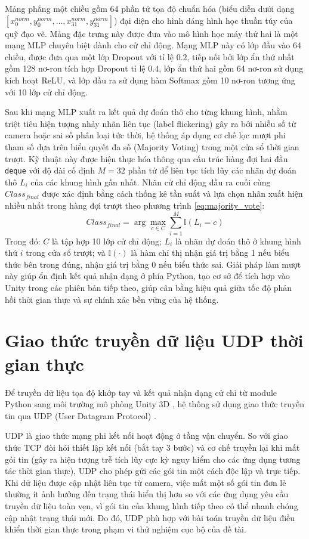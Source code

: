 \documentclass[../BTL.tex]{subfiles}
\begin{document}
Mảng phẳng một chiều gồm 64 phần tử tọa độ chuẩn hóa (biểu diễn dưới dạng $[x^{norm}_0, y^{norm}_0, \dots, x^{norm}_{31}, y^{norm}_{31}]$) đại diện cho hình dáng hình học thuần túy của quỹ đạo vẽ. Mảng đặc trưng này được đưa vào mô hình học máy thứ hai là một mạng MLP chuyên biệt dành cho cử chỉ động. Mạng MLP này có lớp đầu vào 64 chiều, được đưa qua một lớp Dropout với tỉ lệ $0.2$, tiếp nối bởi lớp ẩn thứ nhất gồm 128 nơ-ron tích hợp Dropout tỉ lệ $0.4$, lớp ẩn thứ hai gồm 64 nơ-ron sử dụng kích hoạt ReLU, và lớp đầu ra sử dụng hàm Softmax gồm 10 nơ-ron tương ứng với 10 lớp cử chỉ động.

Sau khi mạng MLP xuất ra kết quả dự đoán thô cho từng khung hình, nhằm triệt tiêu hiện tượng nhảy nhãn liên tục (label flickering) gây ra bởi nhiễu số từ camera hoặc sai số phân loại tức thời, hệ thống áp dụng cơ chế lọc mượt phi tham số dựa trên biểu quyết đa số (Majority Voting) trong một cửa sổ thời gian trượt. Kỹ thuật này được hiện thực hóa thông qua cấu trúc hàng đợi hai đầu \texttt{deque} với độ dài cố định $M = 32$ phần tử để liên tục tích lũy các nhãn dự đoán thô $L_i$ của các khung hình gần nhất. Nhãn cử chỉ động đầu ra cuối cùng $Class_{final}$ được xác định bằng cách thống kê tần suất và lựa chọn nhãn xuất hiện nhiều nhất trong hàng đợi trượt theo phương trình \eqref{eq:majority_vote}:
\begin{equation}
\label{eq:majority_vote}
Class_{final} = \arg \max_{c \in C} \sum_{i=1}^{M} \mathbb{I}(L_i = c)
\end{equation}
Trong đó: $C$ là tập hợp 10 lớp cử chỉ động; $L_i$ là nhãn dự đoán thô ở khung hình thứ $i$ trong cửa sổ trượt; và $\mathbb{I}(\cdot)$ là hàm chỉ thị nhận giá trị bằng 1 nếu biểu thức bên trong đúng, nhận giá trị bằng 0 nếu biểu thức sai. Giải pháp làm mượt này giúp ổn định kết quả nhận dạng ở phía Python, tạo cơ sở để tích hợp vào Unity trong các phiên bản tiếp theo, giúp cân bằng hiệu quả giữa tốc độ phản hồi thời gian thực và sự chính xác bền vững của hệ thống.
\section{Giao thức truyền dữ liệu UDP thời gian thực}
\label{section:2.4}
Để truyền dữ liệu tọa độ khớp tay và kết quả nhận dạng cử chỉ từ module Python sang môi trường mô phỏng Unity 3D \cite{unity3d}, hệ thống sử dụng giao thức truyền tin qua UDP (User Datagram Protocol) \cite{rfc768udp}.

UDP là giao thức mạng phi kết nối hoạt động ở tầng vận chuyển. So với giao thức TCP đòi hỏi thiết lập kết nối (bắt tay 3 bước) và cơ chế truyền lại khi mất gói tin (gây ra hiện tượng trễ tích lũy cực kỳ nguy hiểm cho các ứng dụng tương tác thời gian thực), UDP cho phép gửi các gói tin một cách độc lập và trực tiếp. Khi dữ liệu được cập nhật liên tục từ camera, việc mất một số gói tin đơn lẻ thường ít ảnh hưởng đến trạng thái hiển thị hơn so với các ứng dụng yêu cầu truyền dữ liệu toàn vẹn, vì gói tin của khung hình tiếp theo có thể nhanh chóng cập nhật trạng thái mới. Do đó, UDP phù hợp với bài toán truyền dữ liệu điều khiển thời gian thực trong phạm vi thử nghiệm cục bộ của đề tài.
\end{document}

